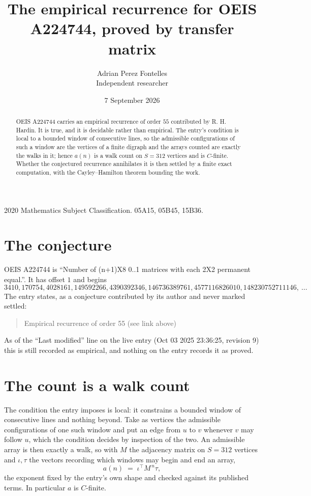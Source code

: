 \documentclass[11pt,a4paper]{article}
\title{The empirical recurrence for OEIS A224744, proved by transfer matrix}
\author{Adrian Perez Fontelles\\ \small Independent researcher}
\date{7 September 2026}
\theoremstyle{plain}
\theoremstyle{definition}
\begin{document}
\maketitle

\begin{abstract}
OEIS A224744 carries an empirical recurrence of order $55$ contributed by R. H. Hardin. It is
true, and it is decidable rather than empirical. The entry's condition is local to a bounded window of consecutive lines, so
the admissible configurations of such a window are the vertices of a finite digraph and the
arrays counted are exactly the walks in it; hence $a(n)$ is a walk count on $S=312$ vertices
and is $C$-finite. Whether the conjectured recurrence annihilates it is then settled by a
finite exact computation, with the Cayley--Hamilton theorem bounding the work.
\end{abstract}

\noindent\small 2020 Mathematics Subject Classification. 05A15, 05B45, 15B36.\normalsize

\section{The conjecture}

OEIS A224744 is ``Number of (n+1)X8 0..1 matrices with each 2X2 permanent equal.''. It has offset $1$ and begins
\[
3410, 170754, 4028161, 149592266, 4390392346, 146736389761, 4577116826010, 148230752711146,\ \dots
\]
The entry states, as a conjecture contributed by its author and never marked settled:
\begin{quote}
Empirical recurrence of order 55 (see link above)
\end{quote}
As of the ``Last modified'' line on the live entry (Oct 03 2025 23:36:25, revision 9) this is still
recorded as empirical, and nothing on the entry records it as proved.

\section{The count is a walk count}

The condition the entry imposes is local: it constrains a bounded window of consecutive lines and nothing beyond. Take as
vertices the admissible configurations of one such window and put an edge from $u$ to $v$
whenever $v$ may follow $u$, which the condition decides by inspection of the two. An
admissible array is then exactly a walk, so with $M$ the adjacency matrix on $S=312$ vertices
and $\iota,\tau$ the vectors recording which windows may begin and end an array,
\[
a(n)\;=\;\iota^{\!\top}M^{\,n}\tau ,
\]
the exponent fixed by the entry's own shape and checked against its published terms. In
particular $a$ is $C$-finite.
\end{document}
